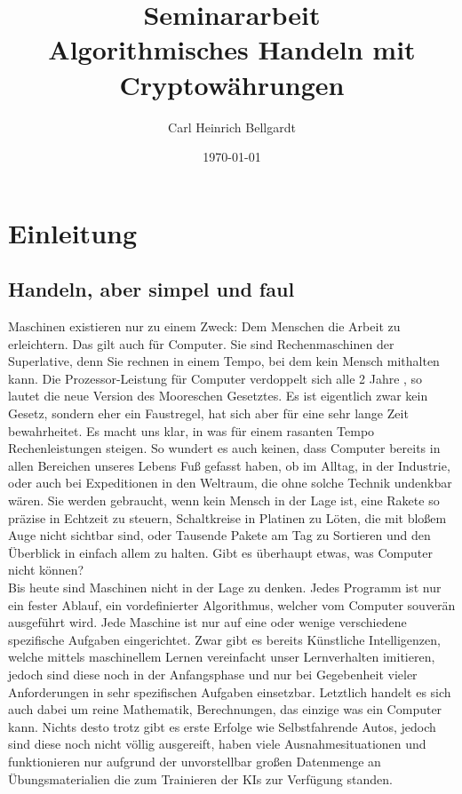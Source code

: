 \documentclass[12pt]{article}
\begin{document}
\begin{titlepage}	
	\title{\LARGE Seminararbeit\\ \large Algorithmisches Handeln mit Cryptowährungen}
	\date{\small \today}
	\author{\small Carl Heinrich Bellgardt}	
	\clearpage\maketitle
	\thispagestyle{empty}
\end{titlepage}

\setcounter{page}{2}
\tableofcontents
\pagebreak
\section{Einleitung}
\subsection{Handeln, aber simpel und faul}
	Maschinen existieren nur zu einem Zweck: Dem Menschen die Arbeit zu erleichtern. Das gilt auch für Computer. Sie sind Rechenmaschinen der Superlative, denn Sie rechnen in einem Tempo, bei dem kein Mensch mithalten kann. \glqq Die Prozessor-Leistung für Computer verdoppelt sich alle 2 Jahre \grqq{}, so lautet die neue Version des Mooreschen Gesetztes. Es ist eigentlich zwar kein Gesetz, sondern eher ein Faustregel, hat sich aber für eine sehr lange Zeit bewahrheitet. Es macht uns klar, in was für einem rasanten Tempo Rechenleistungen steigen. So wundert es auch keinen, dass Computer bereits in allen Bereichen unseres Lebens Fuß gefasst haben, ob im Alltag, in der Industrie, oder auch bei Expeditionen in den Weltraum, die ohne solche Technik undenkbar wären. Sie werden gebraucht, wenn kein Mensch in der Lage ist, eine Rakete so präzise in Echtzeit zu steuern, Schaltkreise in Platinen zu Löten, die mit bloßem Auge nicht sichtbar sind, oder Tausende Pakete am Tag zu Sortieren und den Überblick in einfach allem zu halten. Gibt es überhaupt etwas, was Computer nicht können?\\
	Bis heute sind Maschinen nicht in der Lage zu denken. Jedes Programm ist nur ein fester Ablauf, ein vordefinierter Algorithmus, welcher vom Computer souverän ausgeführt wird. Jede Maschine ist nur auf eine oder wenige verschiedene spezifische Aufgaben eingerichtet. Zwar gibt es bereits Künstliche Intelligenzen, welche mittels maschinellem Lernen vereinfacht unser Lernverhalten imitieren, jedoch sind diese noch in der Anfangsphase und nur bei Gegebenheit vieler Anforderungen in sehr spezifischen Aufgaben einsetzbar. Letztlich handelt es sich auch dabei um reine Mathematik, Berechnungen, das einzige was ein Computer kann. Nichts desto trotz gibt es erste Erfolge wie Selbstfahrende Autos, jedoch sind diese noch nicht völlig ausgereift, haben viele Ausnahmesituationen und funktionieren nur aufgrund der unvorstellbar großen Datenmenge an Übungsmaterialien die zum Trainieren der KIs zur Verfügung standen. \\
\end{document}
